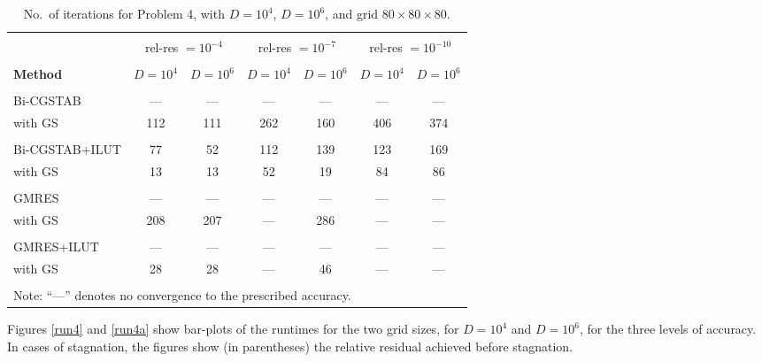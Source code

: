 \documentclass[12pt,a4paper]{article}
\newcounter{i}
\def\time{\!\times\!}
\begin{document}
\begin{table}[!h]
\centering
\begin{tabular}{|l|c|c|c|c|c|c|}
\hline
& \multicolumn{2}{|c|}{}
& \multicolumn{2}{|c|}{}
& \multicolumn{2}{|c|}{}
\\[-11pt]
& \multicolumn{2}{|c|}{rel-res $=\!10^{-4}$}
& \multicolumn{2}{|c|}{rel-res $=\!10^{-7}$}
& \multicolumn{2}{|c|}{rel-res $=\!10^{-10}$} \\
\hline&&&&&&\\[-11pt]
{\bf Method} & $D\!=\!10^4$ & $D\!=\!10^6$ & $D\!=\!10^4$ & 
$D=10^6$ & $D=10^4$ & $D=10^6$ \\
\hline
&&&&&&\\[-12pt]
Bi-CGSTAB &---&---&---&---&---&--- \\
with GS        & 112 & 111 & 262 & 160 & 406 & 374 \\
\hline&&&&&&\\[-12pt]
Bi-CGSTAB+ILUT & 77 & 52 & 112 & 139 & 123 & 169 \\
with GS         & 13 & 13 & 52  & 19 & 84  & 86 \\
\hline
&&&&&&\\[-12pt]
GMRES &---&---&---&---&---&--- \\
with GS & 208 & 207 &---& 286 &---&--- \\
\hline
&&&&&&\\[-12pt]
GMRES+ILUT &---&---&---&---&---&--- \\
with GS & 28 & 28 &---& 46 &---&--- \\
\hline
\multicolumn{7}{|l|}{} \\[-12pt]
\multicolumn{7}{|l|}{Note: ``---'' denotes no convergence 
to the prescribed accuracy.} \\
\hline
\end{tabular}
\caption{No.\ of iterations for Problem 4, with $D=10^4$, $D=10^6$,
and grid $80\time 80\time 80$.}
\label{tbl4}
\end{table}

Figures \ref{run4} and \ref{run4a} show bar-plots of the runtimes 
for the two grid sizes, for $D=10^4$ and $D=10^6$, for the three 
levels of accuracy.  In cases of stagnation, the figures show (in 
parentheses) the relative residual achieved before stagnation.
\end{document}
